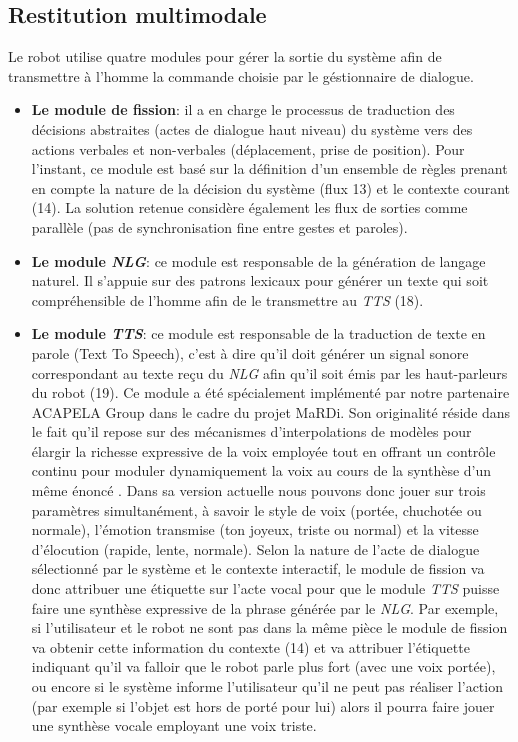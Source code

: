 \documentclass[a4paper,11pt,twoside]{StyleThese}
\begin{document}


\subsection{Restitution multimodale}
Le robot utilise quatre modules pour gérer la sortie du système afin de transmettre à l'homme la commande choisie par le géstionnaire de dialogue.

\begin{itemize}
\item \textbf{Le module de fission}: il a en charge
le processus de traduction des décisions abstraites (actes de dialogue haut niveau) du système vers des actions verbales et non-verbales (déplacement, prise de position).
Pour l’instant, ce module est basé sur la définition d’un ensemble de règles prenant
en compte la nature de la décision du système (flux 13) et le contexte courant (14).
La solution retenue considère également les flux de sorties comme
parallèle (pas de synchronisation fine entre gestes et paroles).

\item \textbf{Le module \textit{NLG}}: ce module est responsable de la génération de langage naturel. Il s'appuie sur des patrons lexicaux pour générer un texte qui soit compréhensible de l'homme afin de le transmettre au \textit{TTS} (18).

\item \textbf{Le module \textit{TTS}}: ce module est responsable de la traduction de texte en parole (Text To Speech), c'est à dire qu'il doit générer un signal sonore correspondant au texte reçu du \textit{NLG} afin qu'il soit émis par les haut-parleurs du robot (19). 
Ce module a été spécialement implémenté par
notre partenaire ACAPELA Group dans le cadre du projet MaRDi. Son originalité réside
dans le fait qu’il repose sur des mécanismes d’interpolations de modèles pour élargir la
richesse expressive de la voix employée tout en offrant un contrôle continu pour moduler
dynamiquement la voix au cours de la synthèse d’un même énoncé \cite{astrinaki2012}. Dans sa version actuelle nous pouvons donc jouer sur trois paramètres simultanément,
à savoir le style de voix (portée, chuchotée ou normale), l’émotion transmise
(ton joyeux, triste ou normal) et la vitesse d’élocution (rapide, lente, normale).
Selon la nature de l’acte de dialogue sélectionné par le système et le contexte interactif,
le module de fission va donc attribuer une étiquette sur l’acte vocal pour que le
module \textit{TTS} puisse faire une synthèse expressive de la phrase générée par le \textit{NLG}. Par
exemple, si l’utilisateur et le robot ne sont pas dans la même pièce le module de fission
va obtenir cette information du contexte (14) et va attribuer l’étiquette indiquant qu’il va falloir que le robot parle plus fort (avec
une voix portée), ou encore si le système informe l’utilisateur qu’il ne peut pas réaliser
l’action (par exemple si l’objet est hors de porté pour lui) alors il pourra faire jouer une
synthèse vocale employant une voix triste.



\end{itemize}
\end{document}
